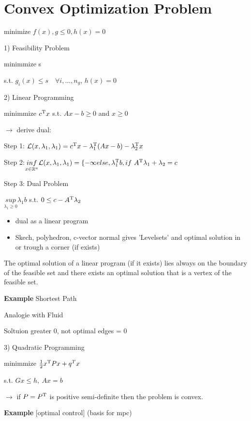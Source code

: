 \section{Convex Optimization Problem}

minimize $f(x),g\le0,h(x)=0$

1) Feasibility  Problem

minimmize s

s.t. $g_i(x)\le s\quad \forall i,\dots,n_g$, $h(x)=0$

2) Linear Programming

minimmize $c^{\textnormal{\scriptsize T}}x$ s.t. $Ax-b\ge0$ and $x\ge0$

$\rightarrow$ derive dual:

Step 1: $\mathcal{L}(x,\lambda_1,\lambda_1) = c^{\textnormal{\scriptsize T}}x-\lambda_1^{\textnormal{\scriptsize T}}(Ax-b) -\lambda_2^{\textnormal{\scriptsize T}}x$

Step 2:$\underset{x \in \mathcal{\mathbb{R}}^n}{inf}\mathcal{L}(x,\lambda_1,\lambda_1)
	= \{-\infty else, \lambda_1^{\trans}b, if\ A^{\trans}\lambda_1+\lambda_2=c$

Step 3: Dual Problem

$\underset{\lambda_1 \ge0}{sup}\lambda_1 b$ s.t. $0\le c-A^{\textnormal{\scriptsize T}}\lambda_2$

\begin{itemize}
	\item dual as a linear program
	\item Skech, polyhedron, c-vector normal gives 'Levelsets'
	      and optimal solution in or trough a corner (if exists)
\end{itemize}

\begin{proposition}
	The optimal solution of a linear program (if it exists)
	lies always on the boundary of the feasible set
	and there exists an optimal solution that is a vertex of the feasible set.
\end{proposition}

\textbf{Example} Shortest Path

Analogie with Fluid

Soltuion greater 0, not optimal edges = 0

3) Quadratic Programming

minimmize $\frac{1}{2}x^{\textnormal{\scriptsize T}}Px+q^Tx$

s.t. $Gx\le h,\ Ax=b$

$\rightarrow$ if $P=P^{\textnormal{\scriptsize T}}$ is positive semi-definite
then the problem is convex.


\textbf{Example} [optimal control] (basis for mpc)

